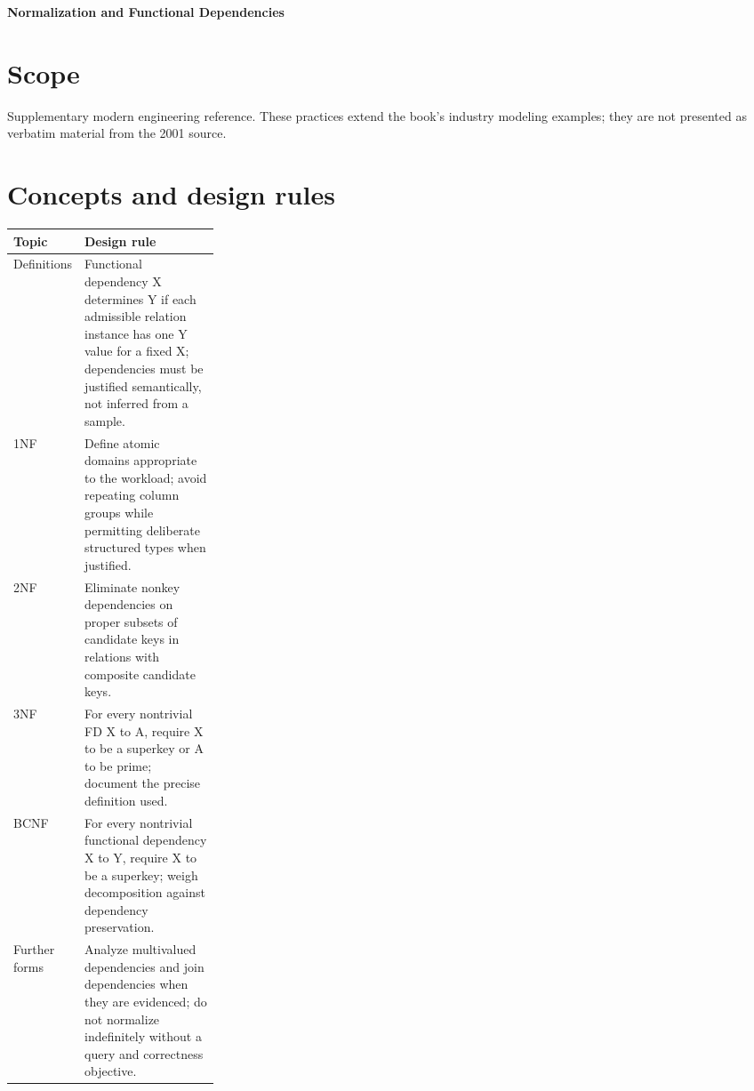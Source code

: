 \documentclass[11pt,letterpaper]{article}
\begin{document}
\begin{center}
{\LARGE\bfseries\color{navy} Normalization and Functional Dependencies}\par
\vspace{0.25em}{\large Supplementary technical reference}\par
{}
\end{center}
\vspace{0.8em}
\section{Scope}
Supplementary modern engineering reference. These practices extend the book's industry modeling examples; they are not presented as verbatim material from the 2001 source.


\section{Concepts and design rules}
\begin{tabularx}{\linewidth}{@{}>{\raggedright\arraybackslash}p{0.27\linewidth}>{\raggedright\arraybackslash}X@{}}
\toprule
\textbf{Topic} & \textbf{Design rule} \\ 
\midrule
Definitions & Functional dependency X determines Y if each admissible relation instance has one Y value for a fixed X; dependencies must be justified semantically, not inferred from a sample. \\ 
1NF & Define atomic domains appropriate to the workload; avoid repeating column groups while permitting deliberate structured types when justified. \\ 
2NF & Eliminate nonkey dependencies on proper subsets of candidate keys in relations with composite candidate keys. \\ 
3NF & For every nontrivial FD X to A, require X to be a superkey or A to be prime; document the precise definition used. \\ 
BCNF & For every nontrivial functional dependency X to Y, require X to be a superkey; weigh decomposition against dependency preservation. \\ 
Further forms & Analyze multivalued dependencies and join dependencies when they are evidenced; do not normalize indefinitely without a query and correctness objective. \\ 
\bottomrule
\end{tabularx}
\end{document}
